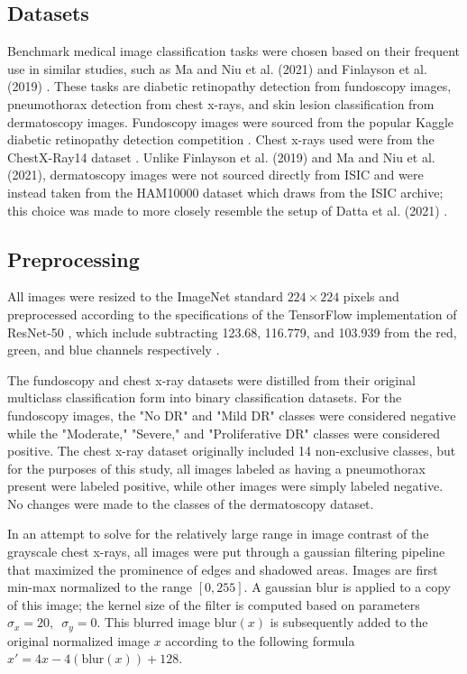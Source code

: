 \documentclass[10pt,twocolumn,letterpaper]{article}
\begin{document}
    \subsection{Datasets}
      Benchmark medical image classification tasks were chosen based on their frequent use in similar studies, such as Ma and Niu et al. (2021) \cite{MaNiu} and Finlayson et al. (2019) \cite{Finlayson}. These tasks are diabetic retinopathy detection from fundoscopy images, pneumothorax detection from chest x-rays, and skin lesion classification from dermatoscopy images. Fundoscopy images were sourced from the popular Kaggle diabetic retinopathy detection competition \cite{KaggleDR}. Chest x-rays used were from the ChestX-Ray14 dataset \cite{ChestX-Ray14}. Unlike Finlayson et al. (2019) \cite{Finlayson} and Ma and Niu et al. \cite{MaNiu} (2021), dermatoscopy images were not sourced directly from ISIC \cite{ISIC} and were instead taken from the HAM10000 dataset \cite{HAM10000} which draws from the ISIC archive; this choice was made to more closely resemble the setup of Datta et al. (2021) \cite{AttentionSkinCancerClassification}.

    \subsection{Preprocessing}
      All images were resized to the ImageNet standard $224 \times 224$ pixels \cite{ImageNet} and preprocessed according to the specifications of the TensorFlow \cite{TensorFlow} implementation of ResNet-50 \cite{ResNet}, which include subtracting 123.68, 116.779, and 103.939 from the red, green, and blue channels respectively \cite{ResNetPreprocessingImplementation}.

      The fundoscopy and chest x-ray datasets were distilled from their original multiclass classification form into binary classification datasets. For the fundoscopy images, the "No DR" and "Mild DR" classes were considered negative while the "Moderate," "Severe," and "Proliferative DR" classes were considered positive. The chest x-ray dataset originally included 14 non-exclusive classes, but for the purposes of this study, all images labeled as having a pneumothorax present were labeled positive, while other images were simply labeled negative. No changes were made to the classes of the dermatoscopy dataset.

      In an attempt to solve for the relatively large range in image contrast of the grayscale chest x-rays, all images were put through a gaussian filtering pipeline that maximized the prominence of edges and shadowed areas. Images are first min-max normalized to the range $[0,255]$. A gaussian blur is applied to a copy of this image; the kernel size of the filter is computed based on parameters $\sigma_x=20,\,\,\, \sigma_y=0$. This blurred image $\text{blur}(x)$ is subsequently added to the original normalized image $x$ according to the following formula $x' = 4x - 4(\text{blur}(x)) + 128$.
\end{document}
